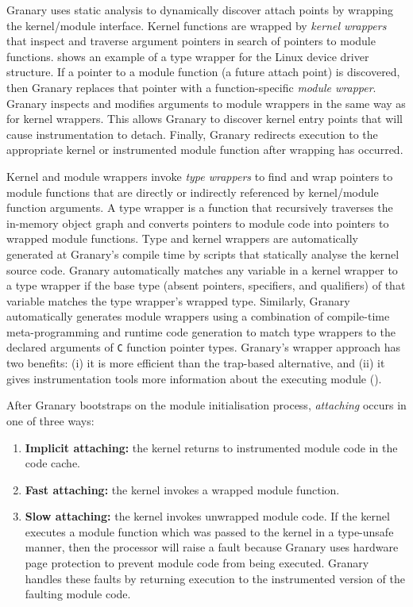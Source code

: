 \documentclass[preprint]{sigplanconf}
\begin{document}
Granary uses static analysis to dynamically discover attach points by wrapping the kernel/module interface. Kernel functions are wrapped by \emph{kernel wrappers} that inspect and traverse argument pointers in search of pointers to module functions.  shows an example of a type wrapper for the Linux device driver structure. If a pointer to a module function (a future attach point) is discovered, then Granary replaces that pointer with a function-specific \emph{module wrapper}. Granary inspects and modifies arguments to module wrappers in the same way as for kernel wrappers. This allows Granary to discover kernel entry points that will cause instrumentation to detach. Finally, Granary redirects execution to the appropriate kernel or instrumented module function after wrapping has occurred.

Kernel and module wrappers invoke \emph{type wrappers} to find and wrap pointers to module functions that are directly or indirectly referenced by kernel/module function arguments. A type wrapper is a function that recursively  traverses the in-memory object graph and converts pointers to module code into pointers to wrapped module functions. Type and kernel wrappers are automatically generated at Granary's compile time by scripts that statically analyse the kernel source code. Granary automatically matches any variable in a kernel wrapper to a type wrapper if the base type (absent pointers, specifiers, and qualifiers) of that variable matches the type wrapper's wrapped type. Similarly, Granary automatically generates module wrappers using a combination of compile-time meta-programming and runtime code generation to match type wrappers to the declared arguments of \texttt{C} function pointer types.  Granary's wrapper approach has two benefits: (i) it is more efficient than the trap-based alternative, and (ii) it gives instrumentation tools more information about the executing module ().

After Granary bootstraps on the module initialisation process, \emph{attaching} occurs in one of three ways: \begin{enumerate}
	\item {\bf Implicit attaching:} the kernel returns to instrumented module code in the code cache.
	\item {\bf Fast attaching:} the kernel invokes a wrapped module function.
	\item {\bf Slow attaching:} the kernel invokes unwrapped module code. If the kernel executes a module function which was passed to the kernel in a type-unsafe manner, then the processor will raise a fault because Granary uses hardware page protection to prevent module code from being executed. Granary handles these faults by returning execution to the instrumented version of the faulting module code.
\end{enumerate}
\end{document}
